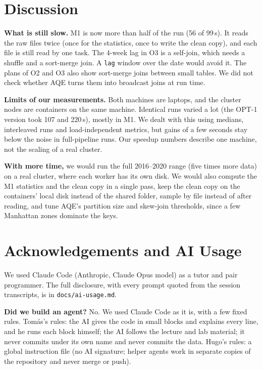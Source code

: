 \documentclass[sigconf]{acmart}
\begin{document}
\section{Discussion}

\textbf{What is still slow.} M1 is now more than half of the run (56 of 99\,s). It reads the raw files twice (once
for the statistics, once to write the clean copy), and each file is still read by one task. The 4-week lag in O3 is
a self-join, which needs a shuffle and a sort-merge join. A \texttt{lag} window over the date would avoid it. The
plans of O2 and O3 also show sort-merge joins between small tables. We did not check whether AQE turns them into
broadcast joins at run time.

\textbf{Limits of our measurements.} Both machines are laptops, and the cluster nodes are containers on the same
machine. Identical runs varied a lot (the OPT-1 version took 107 and 220\,s), mostly in M1. We dealt with this using medians, interleaved runs and
load-independent metrics, but gains of a few seconds stay below the noise in full-pipeline runs. Our speedup numbers
describe one machine, not the scaling of a real cluster.

\textbf{With more time,} we would run the full 2016--2020 range (five times more data) on a real cluster, where each
worker has its own disk. We would also compute the M1 statistics and the clean copy in a single pass, keep the clean
copy on the containers' local disk instead of the shared folder, sample by file instead of after reading, and tune
AQE's partition size and skew-join thresholds, since a few Manhattan zones dominate the keys.

\clearpage
\section*{Acknowledgements and AI Usage}

We used Claude Code (Anthropic, Claude Opus model) as a tutor and pair programmer. The full disclosure, with every
prompt quoted from the session transcripts, is in \texttt{docs/ai-usage.md}.

\textbf{Did we build an agent?} No. We used Claude Code as it is, with a few fixed rules. Tomás's rules: the AI gives
the code in small blocks and explains every line, and he runs each block himself; the AI follows the lecture and lab
material; it never commits under its own name and never commits the data. Hugo's rules: a global instruction file
(no AI signature; helper agents work in separate copies of the repository and never merge or push).
\end{document}
